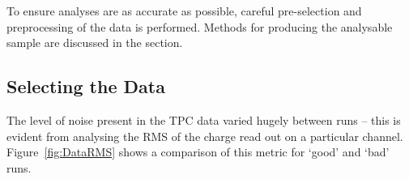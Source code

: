 To ensure analyses are as accurate as possible, careful pre-selection and preprocessing of the data is performed.  Methods for producing the analysable sample are discussed in the section.

\subsection{Selecting the Data}\label{sec:SelectingTheData}

The level of noise present in the TPC data varied hugely between runs -- this is evident from analysing the RMS of the charge read out on a particular channel.  Figure~\ref{fig:DataRMS} shows a comparison of this metric for `good' and `bad' runs.

